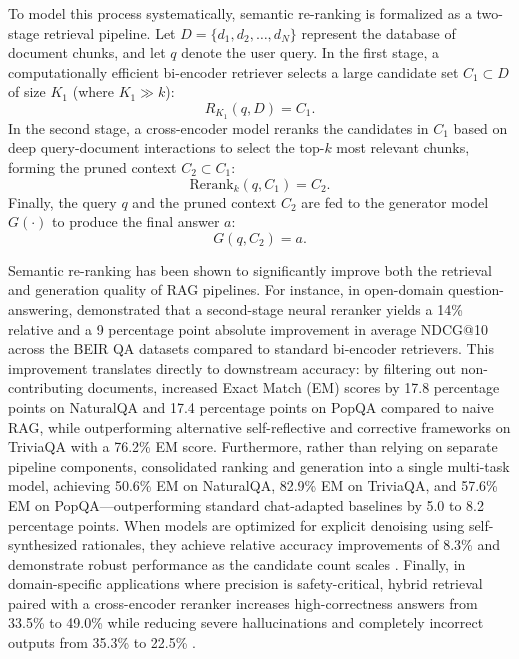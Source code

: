 To model this process systematically, semantic re-ranking is formalized as a two-stage retrieval pipeline. Let $D = \{d_1, d_2, \ldots, d_N\}$ represent the database of document chunks, and let $q$ denote the user query. In the first stage, a computationally efficient bi-encoder retriever selects a large candidate set $C_1 \subset D$ of size $K_1$ (where $K_1 \gg k$):
\begin{equation}
R_{K_1}(q, D) = C_1.
\end{equation}
In the second stage, a cross-encoder model reranks the candidates in $C_1$ based on deep query-document interactions to select the top-$k$ most relevant chunks, forming the pruned context $C_2 \subset C_1$:
\begin{equation}
\text{Rerank}_k(q, C_1) = C_2.
\end{equation}
Finally, the query $q$ and the pruned context $C_2$ are fed to the generator model $G(\cdot)$ to produce the final answer $a$:
\begin{equation}
G(q, C_2) = a.
\end{equation}


Semantic re-ranking has been shown to significantly improve both the retrieval and generation quality of RAG pipelines. For instance, in open-domain question-answering, \citet{moreira2024enhancing} demonstrated that a second-stage neural reranker yields a 14\% relative and a 9 percentage point absolute improvement in average NDCG@10 across the BEIR QA datasets compared to standard bi-encoder retrievers. This improvement translates directly to downstream accuracy: by filtering out non-contributing documents, \citet{wang2025infogain} increased Exact Match (EM) scores by 17.8 percentage points on NaturalQA and 17.4 percentage points on PopQA compared to naive RAG, while outperforming alternative self-reflective and corrective frameworks on TriviaQA with a 76.2\% EM score. Furthermore, rather than relying on separate pipeline components, \citet{yu2024rankrag} consolidated ranking and generation into a single multi-task model, achieving 50.6\% EM on NaturalQA, 82.9\% EM on TriviaQA, and 57.6\% EM on PopQA—outperforming standard chat-adapted baselines by 5.0 to 8.2 percentage points. When models are optimized for explicit denoising using self-synthesized rationales, they achieve relative accuracy improvements of 8.3\% and demonstrate robust performance as the candidate count scales \cite{wei2025instructrag}. Finally, in domain-specific applications where precision is safety-critical, hybrid retrieval paired with a cross-encoder reranker increases high-correctness answers from 33.5\% to 49.0\% while reducing severe hallucinations and completely incorrect outputs from 35.3\% to 22.5\% \cite{cheng2026enhancing}.

